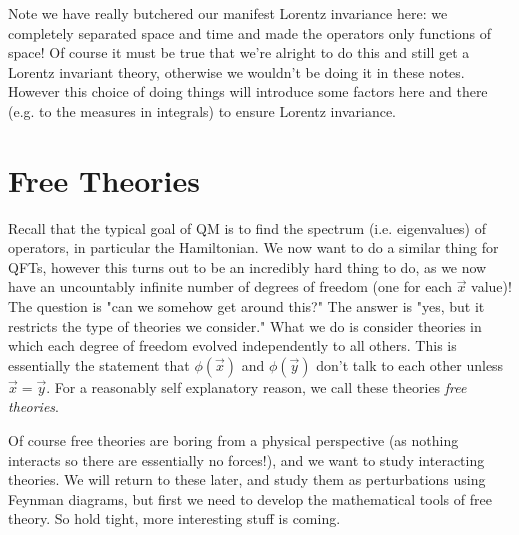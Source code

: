 \br 
\label{rem:ButcheredLorentzInv}
    Note we have really butchered our manifest Lorentz invariance here: we completely separated space and time and made the operators only functions of space! Of course it must be true that we're alright to do this and still get a Lorentz invariant theory, otherwise we wouldn't be doing it in these notes. However this choice of doing things will introduce some factors here and there (e.g. to the measures in integrals) to ensure Lorentz invariance.
\er 

\section{Free Theories}

Recall that the typical goal of QM is to find the spectrum (i.e. eigenvalues) of operators, in particular the Hamiltonian. We now want to do a similar thing for QFTs, however this turns out to be an incredibly hard thing to do, as we now have an uncountably infinite number of degrees of freedom (one for each $\Vec{x}$ value)! The question is "can we somehow get around this?" The answer is "yes, but it restricts the type of theories we consider." What we do is consider theories in which each degree of freedom evolved independently to all others. This is essentially the statement that $\phi(\vec{x})$ and $\phi(\vec{y})$ don't talk to each other unless $\vec{x}=\vec{y}$. For a reasonably self explanatory reason, we call these theories \textit{free theories}.

\br
    Of course free theories are boring from a physical perspective (as nothing interacts so there are essentially no forces!), and we want to study interacting theories. We will return to these later, and study them as perturbations using Feynman diagrams, but first we need to develop the mathematical tools of free theory. So hold tight, more interesting stuff is coming. 
\er 

